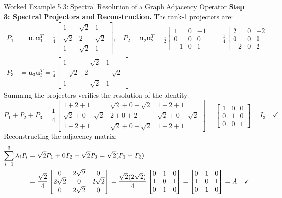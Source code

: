 \begin{examplebox}{Worked Example 5.3: Spectral Resolution of a Graph Adjacency Operator}
\textbf{Step 3: Spectral Projectors and Reconstruction.}
The rank-1 projectors are:
\begin{align}
P_1 &= \mathbf{u}_1 \mathbf{u}_1^T = \frac{1}{4} \begin{bmatrix} 1 & \sqrt{2} & 1 \\ \sqrt{2} & 2 & \sqrt{2} \\ 1 & \sqrt{2} & 1 \end{bmatrix}, \quad
P_2 = \mathbf{u}_2 \mathbf{u}_2^T = \frac{1}{2} \begin{bmatrix} 1 & 0 & -1 \\ 0 & 0 & 0 \\ -1 & 0 & 1 \end{bmatrix} = \frac{1}{4} \begin{bmatrix} 2 & 0 & -2 \\ 0 & 0 & 0 \\ -2 & 0 & 2 \end{bmatrix} \\
P_3 &= \mathbf{u}_3 \mathbf{u}_3^T = \frac{1}{4} \begin{bmatrix} 1 & -\sqrt{2} & 1 \\ -\sqrt{2} & 2 & -\sqrt{2} \\ 1 & -\sqrt{2} & 1 \end{bmatrix}
\end{align}
Summing the projectors verifies the resolution of the identity:
\begin{equation}
P_1 + P_2 + P_3 = \frac{1}{4} \begin{bmatrix} 1 + 2 + 1 & \sqrt{2} + 0 - \sqrt{2} & 1 - 2 + 1 \\ \sqrt{2} + 0 - \sqrt{2} & 2 + 0 + 2 & \sqrt{2} + 0 - \sqrt{2} \\ 1 - 2 + 1 & \sqrt{2} + 0 - \sqrt{2} & 1 + 2 + 1 \end{bmatrix} = \begin{bmatrix} 1 & 0 & 0 \\ 0 & 1 & 0 \\ 0 & 0 & 1 \end{bmatrix} = I_3 \quad \checkmark
\end{equation}
Reconstructing the adjacency matrix:
\begin{align}
\sum_{i=1}^3 \lambda_i P_i &= \sqrt{2} P_1 + 0 P_2 - \sqrt{2} P_3 = \sqrt{2}(P_1 - P_3) \notag \\
&= \frac{\sqrt{2}}{4} \begin{bmatrix} 0 & 2\sqrt{2} & 0 \\ 2\sqrt{2} & 0 & 2\sqrt{2} \\ 0 & 2\sqrt{2} & 0 \end{bmatrix} = \frac{\sqrt{2}(2\sqrt{2})}{4} \begin{bmatrix} 0 & 1 & 0 \\ 1 & 0 & 1 \\ 0 & 1 & 0 \end{bmatrix} = \begin{bmatrix} 0 & 1 & 0 \\ 1 & 0 & 1 \\ 0 & 1 & 0 \end{bmatrix} = A \quad \checkmark

\end{align}
\end{examplebox}
